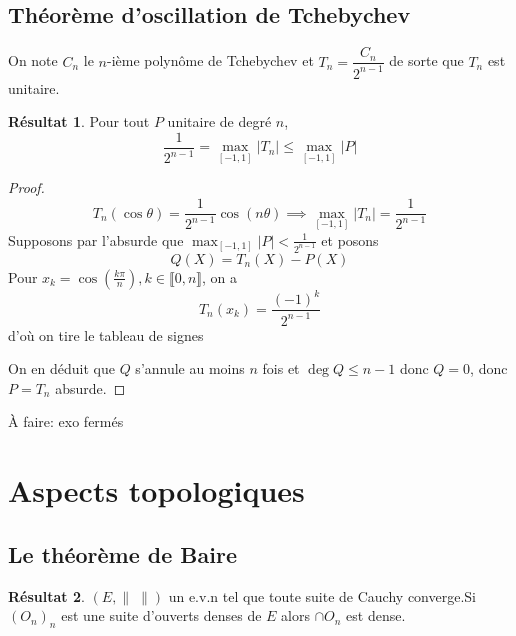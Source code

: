 \documentclass{article}
\theoremstyle{definition}
\newtheorem*{res}{Résultat}
\newcommand{\todo}[1]{{\color{red}À faire: #1}}
\begin{document}
\subsection{Théorème d'oscillation de Tchebychev}

On note $C_n$ le $n$-ième polynôme de Tchebychev et $T_n=\dfrac{C_n}{2^{n-1}}$ de sorte que $T_n$ est unitaire.

\begin{res}
Pour tout $P$ unitaire de degré $n$, \[
    \frac 1{2^{n-1}}=\max_{[-1, 1]}|T_n|\leq \max_{[-1, 1]}|P|
\]
\end{res}

\begin{proof}
\[
    T_n(\cos \theta)=\frac1{2^{n-1}}\cos (n\theta) \implies \max_{[-1, 1]}|T_n|=\frac1{2^{n-1}}
\]
Supposons par l'absurde que $\displaystyle\max_{[-1, 1]}|P|<\frac1{2^{n-1}}$ et posons \[
    Q(X)=T_n(X)-P(X)
\]
Pour $x_k=\cos\left(\frac{k\pi}n\right), k\in\llbracket 0, n\rrbracket$, on a \[
    T_n(x_k)=\frac{(-1)^k}{2^{n-1}}
\]
d'où on tire le tableau de signes
\begin{center}
\end{center}
On en déduit que $Q$ s'annule au moins $n$ fois et $\deg Q\leq n-1$ donc $Q=0$, donc $P=T_n$ absurde.
\end{proof}

\todo{exo fermés}

\section{Aspects topologiques}

\subsection{Le théorème de Baire}

\begin{res}
$(E, \|\;\|)$ un e.v.n tel que toute suite de Cauchy converge.Si $(O_n)_n$ est une suite d'ouverts denses de $E$ alors $\cap O_n$ est dense.
\end{res}
\end{document}
